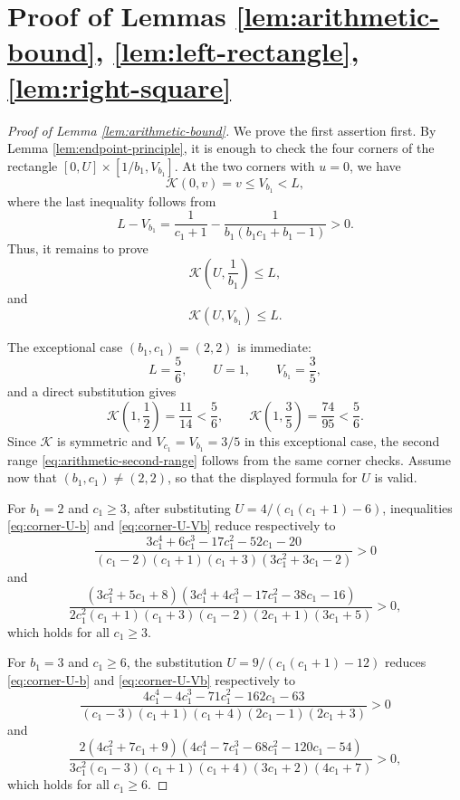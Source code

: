 \documentclass[11pt]{amsart}
\newcommand{\Kfun}{\mathcal K}
\begin{document}
\appendix

\section{Proof of Lemmas \ref{lem:arithmetic-bound}, \ref{lem:left-rectangle}, \ref{lem:right-square}}\label{sec:addendix}

\begin{proof}[Proof of Lemma \ref{lem:arithmetic-bound}]
We prove the first assertion first.  By Lemma \ref{lem:endpoint-principle}, it
is enough to check the four corners of the rectangle
$[0,U]\times[1/b_1,V_{b_1}]$.  At the two corners with $u=0$, we have
$$
        \Kfun(0,v)=v\le V_{b_1}<L,
$$
where the last inequality follows from
$$
        L-V_{b_1}
        =\frac1{c_1+1}-\frac1{b_1(b_1c_1+b_1-1)}>0.
$$
Thus, it remains to prove
\begin{equation}\label{eq:corner-U-b}
        \Kfun\left(U,\frac{1}{b_1}\right)\le L,
\end{equation}
and
\begin{equation}\label{eq:corner-U-Vb}
        \Kfun(U,V_{b_1})\le L.
\end{equation}

The exceptional case $(b_1,c_1)=(2,2)$ is immediate:
$$
        L=\frac56,
        \qquad
        U=1,
        \qquad
        V_{b_1}=\frac35,
$$
and a direct substitution gives
$$
        \Kfun\left(1,\frac12\right)=\frac{11}{14}<\frac56,
        \qquad
        \Kfun\left(1,\frac35\right)=\frac{74}{95}<\frac56.
$$
Since $\Kfun$ is symmetric and $V_{c_1}=V_{b_1}=3/5$ in this exceptional case,
the second range \eqref{eq:arithmetic-second-range} follows from the same corner checks.  Assume now that
$(b_1,c_1)\ne(2,2)$, so that the displayed formula for $U$ is valid.

For $b_1=2$ and $c_1\geq3$, after substituting $U=4/(c_1(c_1+1)-6)$, inequalities
\eqref{eq:corner-U-b} and \eqref{eq:corner-U-Vb} reduce respectively to
$$
        \frac{3c_1^4+6c_1^3-17c_1^2-52c_1-20}{(c_1-2)(c_1+1)(c_1+3)(3c_1^2+3c_1-2)}>0
$$
and
$$
        \frac{(3c_1^2+5c_1+8)(3c_1^4+4c_1^3-17c_1^2-38c_1-16)}{2c_1^2(c_1+1)(c_1+3)(c_1-2)(2c_1+1)(3c_1+5)}>0,
$$
which holds for all $c_1\ge3$.

For $b_1=3$ and $c_1\geq6$, the substitution $U=9/(c_1(c_1+1)-12)$ reduces \eqref{eq:corner-U-b} and \eqref{eq:corner-U-Vb} respectively to
$$
        \frac{4c_1^4-4c_1^3-71c_1^2-162c_1-63}{(c_1-3)(c_1+1)(c_1+4)(2c_1-1)(2c_1+3)}>0
$$
and
$$
        \frac{2(4c_1^2+7c_1+9)(4c_1^4-7c_1^3-68c_1^2-120c_1-54)}{3c_1^2(c_1-3)(c_1+1)(c_1+4)(3c_1+2)(4c_1+7)}>0,
$$
which holds for all $c_1\geq6$.


\end{proof}
\end{document}

